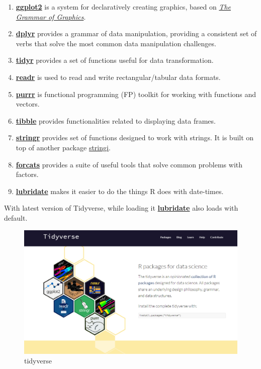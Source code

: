 \documentclass[
]{book}
\providecommand{\tightlist}{%
  \setlength{\itemsep}{0pt}\setlength{\parskip}{0pt}}
\begin{document}
\begin{enumerate}
\def\labelenumi{\arabic{enumi}.}
\tightlist
\item
  \href{https://ggplot2.tidyverse.org/}{\textbf{ggplot2}} is a system for declaratively creating graphics, based on \href{https://link.springer.com/book/10.1007/0-387-28695-0}{\emph{The Grammar of Graphics}}.
\item
  \href{https://dplyr.tidyverse.org/}{\textbf{dplyr}} provides a grammar of data manipulation, providing a consistent set of verbs that solve the most common data manipulation challenges.
\item
  \href{https://tidyr.tidyverse.org/}{\textbf{tidyr}} provides a set of functions useful for data transformation.
\item
  \href{https://readr.tidyverse.org/}{\textbf{readr}} is used to read and write rectangular/tabular data formats.
\item
  \href{https://purrr.tidyverse.org/}{\textbf{purrr}} is functional programming (FP) toolkit for working with functions and vectors.
\item
  \href{https://tibble.tidyverse.org/}{\textbf{tibble}} provides functionalities related to displaying data frames.
\item
  \href{https://stringr.tidyverse.org/}{\textbf{stringr}} provides set of functions designed to work with strings. It is built on top of another package \href{https://cran.r-project.org/package=stringi}{stringi}.
\item
  \href{https://forcats.tidyverse.org/}{\textbf{forcats}} provides a suite of useful tools that solve common problems with factors.
\item
  \href{https://lubridate.tidyverse.org/}{\textbf{lubridate}} makes it easier to do the things R does with date-times.
\end{enumerate}

With latest version of Tidyverse, while loading it \href{https://lubridate.tidyverse.org/}{\textbf{lubridate}} also loads with default.

\begin{figure}

{\centering \includegraphics[width=0.7\linewidth]{images/tidyverse} 

}

\caption{tidyverse}\label{fig:tidyverse}
\end{figure}
\end{document}
